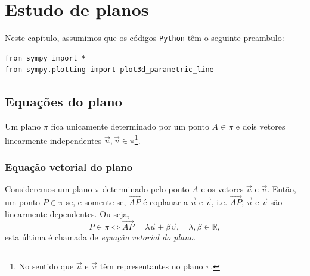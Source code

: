 
\chapter{Estudo de planos}\label{cap_ep}
\thispagestyle{fancy}

\ifispython
\begin{obs}\label{obs:cap_ep_py}
  Neste capítulo, assumimos que os códigos \verb+Python+ têm o seguinte preambulo:
\begin{verbatim}
from sympy import *
from sympy.plotting import plot3d_parametric_line
\end{verbatim}
\end{obs}
\fi

\section{Equações do plano}\label{cap_ep_sec_eqsplano}

Um plano $\pi$ fica unicamente determinado por um ponto $A\in \pi$ e dois vetores linearmente independentes $\vec{u},\vec{v}\in \pi$\footnote{No sentido que $\vec{u}$ e $\vec{v}$ têm representantes no plano $\pi$.}.

\subsection{Equação vetorial do plano}

Consideremos um plano $\pi$ determinado pelo ponto $A$ e os vetores $\vec{u}$ e $\vec{v}$. Então, um ponto $P\in \pi$ se, e somente se, $\overrightarrow{AP}$ é coplanar a $\vec{u}$ e $\vec{v}$, i.e. $\overrightarrow{AP}$, $\vec{u}$ e $\vec{v}$ são linearmente dependentes. Ou seja,
\begin{equation}
  P\in\pi \Leftrightarrow \overrightarrow{AP} = \lambda\vec{u}+\beta\vec{v},\quad\lambda,\beta\in\mathbb{R},
\end{equation}
esta última é chamada de \emph{equação vetorial do plano}.

